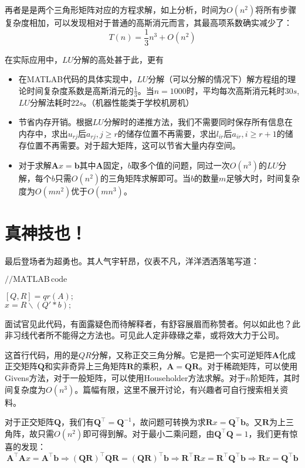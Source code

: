 再者是是两个三角形矩阵对应的方程求解，如上分析，时间为$O(n^2)$将所有步骤复杂度相加，可以发现相对于普通的高斯消元而言，其最高项系数确实减少了：
\[T(n)=\frac{1}{3}n^3+O(n^2)\]

在实际应用中，$LU$分解的高处甚于此，更有
\begin{itemize}
	\item 在MATLAB代码的具体实现中，$LU$分解（可以分解的情况下）解方程组的理论时间复杂度系数是高斯消元的$\frac{1}{3}$。当$n=1000$时，平均每次高斯消元耗时$30s$, $LU$分解法耗时$22s$。（机器性能类于学校机房机）
	\item 节省内存开销。根据$LU$分解时的递推方法，我们不需要同时保存所有信息在内存中，求出$u_{rj}$后$a_{rj},j\geq r$的储存位置不再需要，求出$l_{ir}$后$a_{ir},i\geq r+1$的储存位置不再需要。对于超大矩阵，这可以节省大量内存空间。
	\item 对于求解$\boldsymbol Ax=\boldsymbol b$其中$\boldsymbol A$固定，$b$取多个值的问题，同过一次$O(n^3)$的$LU$分解，每个$b$只需$O(n^2)$的三角矩阵求解即可。当$b$的数量$m$足够大时，时间复杂度为$O(mn^2)$优于$O(mn^3)$。
\end{itemize}

\section{真神技也！}
最后登场者为超勇也。其人气宇轩昂，仪表不凡，洋洋洒洒落笔写道：
\begin{solution}
	$\mathrm{//MATLAB\,code}$
	\begin{center}
		$[Q, R] = qr(A);$ \\ $x=R\backslash(Q'*b);$
	\end{center}
\end{solution}

面试官见此代码，有面露疑色而待解释者，有舒容展眉而称赞者。何以如此也？此非习线代者所不能得之方法也。可见此人定非碌碌之辈，或将效大力于公司。

这首行代码，用的是$QR$分解，又称正交三角分解。它是把一个实可逆矩阵$\boldsymbol A$化成正交矩阵$\boldsymbol Q$和实非奇异上三角矩阵$\boldsymbol R$的乘积，$\boldsymbol A=\boldsymbol Q\boldsymbol R$。对于稀疏矩阵，可以使用Givens方法，对于一般矩阵，可以使用Householder方法求解。对于$n$阶矩阵，其时间复杂度为$O(n^3)$。篇幅有限，这里不展开讨论，有兴趣者可自行搜索相关资料。

对于正交矩阵$\boldsymbol Q$，我们有$\boldsymbol Q^\top =\boldsymbol Q^{-1}$，故问题可转换为求$\boldsymbol Rx=\boldsymbol Q^\top \boldsymbol b$。又$\boldsymbol R$为上三角阵，故只需$O(n^2)$即可得到解。对于最小二乘问题，由$\boldsymbol Q^\top \boldsymbol Q=1$，我们更有惊喜的发现：
\[\boldsymbol A^\top \boldsymbol Ax=\boldsymbol A^\top \boldsymbol b\Rightarrow (\boldsymbol Q\boldsymbol R)^\top \boldsymbol Q\boldsymbol R=(\boldsymbol Q\boldsymbol R)^\top \boldsymbol b\Rightarrow \boldsymbol R^\top \boldsymbol Rx=\boldsymbol R^\top \boldsymbol Q^\top \boldsymbol b\Rightarrow \boldsymbol Rx=\boldsymbol Q^\top \boldsymbol b\]

